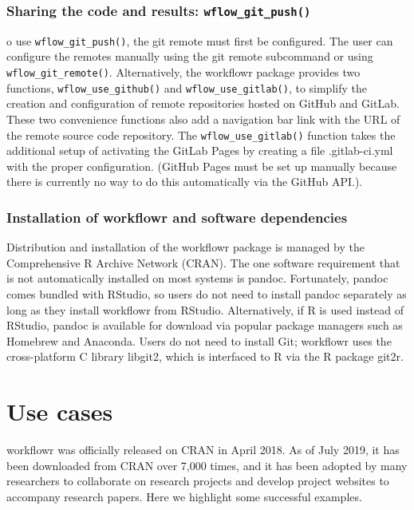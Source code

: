 \documentclass[9pt,a4paper]{extarticle}
\begin{document}
\subsubsection*{Sharing the code and results: \verb|wflow_git_push()|}

o use \verb|wflow_git_push()|, the git remote must first be configured. The
user can configure the remotes manually using the git remote subcommand
or using \verb|wflow_git_remote()|. Alternatively, the workflowr package
provides two functions, \verb|wflow_use_github()| and \verb|wflow_use_gitlab()|, to
simplify the creation and configuration of remote repositories hosted on
GitHub and GitLab. These two convenience functions also add a navigation
bar link with the URL of the remote source code repository. The
\verb|wflow_use_gitlab()| function takes the additional setup of activating the
GitLab Pages by creating a file .gitlab-ci.yml with the proper
configuration. (GitHub Pages must be set up manually because there is
currently no way to do this automatically via the GitHub API.).

\subsubsection*{Installation of workflowr and software dependencies}

Distribution and installation of the workflowr package is managed by the
Comprehensive R Archive Network (CRAN). The one software requirement
that is not automatically installed on most systems is pandoc.
Fortunately, pandoc comes bundled with RStudio, so users do not need to
install pandoc separately as long as they install workflowr from
RStudio. Alternatively, if R is used instead of RStudio, pandoc is
available for download via popular package managers such as Homebrew and
Anaconda. Users do not need to install Git; workflowr uses the
cross-platform C library libgit2, which is interfaced to R via the R
package git2r.


\section*{Use cases} 

workflowr was officially released on CRAN in April 2018. As of July
2019, it has been downloaded from CRAN over 7,000 times, and it has been
adopted by many researchers to collaborate on research projects and
develop project websites to accompany research papers. Here we highlight
some successful examples.
\end{document}
